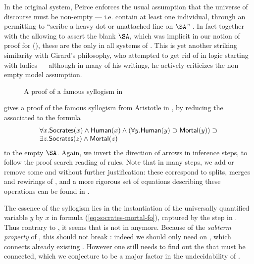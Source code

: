 \begin{scope}
\begin{scope}
\begin{description}
\end{description}

\begin{remark}
In the original  system, Peirce enforces the usual 
assumption that the universe of discourse must be non-empty --- i.e. contain at
least one individual, through an \emph{} permitting to ``scribe a heavy dot
or unattached line on $\SA$'' \cite[p.~47]{Roberts+1973}. In fact together with
the  allowing to assert the blank $\SA$, which was implicit in our notion
of proof for  (), these are the only  in all
systems of . This is yet another striking similarity with Girard's philosophy,
who attempted to get rid of  in logic starting with ludics --- although in
many of his writings, he actively criticizes the non-empty model assumption.
\end{remark}

\begin{figure*}
  
  \caption{A proof of a famous syllogism in }
\end{figure*}

 gives a proof of the famous syllogism from Aristotle
in , by reducing the  associated to the formula
\begin{equation}
  \begin{array}{l}
    \forall x. \mbox{\textsf{Socrates}}(x) \land \mbox{\textsf{Human}}(x) \land (\forall y. \mbox{\textsf{Human}}(y) \supset \mbox{\textsf{Mortal}}(y)) \supset \\
    \exists z. \mbox{\textsf{Socrates}}(z) \land \mbox{\textsf{Mortal}}(z) \label{eq:socrates-mortal-fo}
  \end{array}
\end{equation}
to the empty $\SA$. Again, we invert the direction of arrows in inference steps,
to follow the proof search reading of rules. Note that in many steps, we add or
remove some  and  without further justification: these
correspond to splits, merges and rewirings of , and a more rigorous set of
equations describing these operations can be found in \cite[Section 3: ``The
algebra of lines of identity'']{pietarinen_compositional_2020}.

The essence of the syllogism lies in the instantiation of the universally
quantified variable $y$ by $x$ in formula (\ref{eq:socrates-mortal-fo}),
captured by the  step in . Thus
contrary to , it seems that  is not  in
 anymore. Because of the \emph{subterm property} of 
, this should not break :
indeed we should only need  on , which connects already
existing . However one still needs to find out the  that must be
connected, which we conjecture to be a major factor in the undecidability of
.


\end{scope}
\end{scope}
